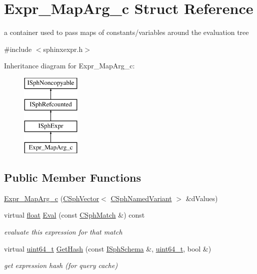 \hypertarget{structExpr__MapArg__c}{\section{Expr\-\_\-\-Map\-Arg\-\_\-c Struct Reference}
\label{structExpr__MapArg__c}
}


a container used to pass maps of constants/variables around the evaluation tree  




{\ttfamily \#include $<$sphinxexpr.\-h$>$}

Inheritance diagram for Expr\-\_\-\-Map\-Arg\-\_\-c\-:\begin{figure}[H]
\begin{center}
\leavevmode
\includegraphics[height=4.000000cm]{structExpr__MapArg__c}
\end{center}
\end{figure}
\subsection*{Public Member Functions}
\begin{DoxyCompactItemize}
\item 
\hyperlink{structExpr__MapArg__c_a1aa84964243aedf817ed8d2abe910341}{Expr\-\_\-\-Map\-Arg\-\_\-c} (\hyperlink{classCSphVector}{C\-Sph\-Vector}$<$ \hyperlink{structCSphNamedVariant}{C\-Sph\-Named\-Variant} $>$ \&d\-Values)
\item 
virtual \hyperlink{sphinxexpr_8cpp_a0e0d0739f7035f18f949c2db2c6759ec}{float} \hyperlink{structExpr__MapArg__c_aa237474a2708f43606aba2248d2f35a2}{Eval} (const \hyperlink{classCSphMatch}{C\-Sph\-Match} \&) const 
\begin{DoxyCompactList}\small\item\em evaluate this expression for that match \end{DoxyCompactList}\item 
virtual \hyperlink{sphinxstd_8h_aaa5d1cd013383c889537491c3cfd9aad}{uint64\-\_\-t} \hyperlink{structExpr__MapArg__c_a7e871bee305800257f710f812b74a775}{Get\-Hash} (const \hyperlink{classISphSchema}{I\-Sph\-Schema} \&, \hyperlink{sphinxstd_8h_aaa5d1cd013383c889537491c3cfd9aad}{uint64\-\_\-t}, bool \&)
\begin{DoxyCompactList}\small\item\em get expression hash (for query cache) \end{DoxyCompactList}\end{DoxyCompactItemize}
